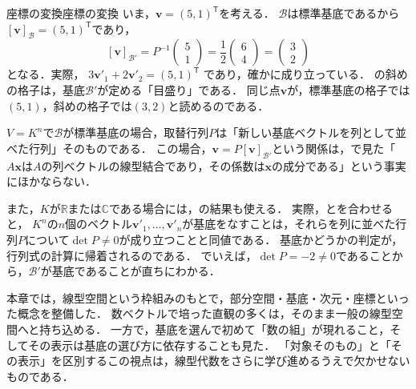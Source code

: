 \begin{example}{座標の変換}{座標の変換}
  いま，$\bm{v} = (5,1)^\mathsf{T}$を考える．
  $\mathcal{B}$は標準基底であるから$[\bm{v}]_{\mathcal{B}} = (5,1)^\mathsf{T}$であり，
  \[
    [\bm{v}]_{\mathcal{B}'}
    = P^{-1}\begin{pmatrix} 5 \\ 1 \end{pmatrix}
    = \frac{1}{2}\begin{pmatrix} 6 \\ 4 \end{pmatrix}
    = \begin{pmatrix} 3 \\ 2 \end{pmatrix}
  \]
  となる．実際，
  $3\bm{v}'_1 + 2\bm{v}'_2 = (5,1)^\mathsf{T}$
  であり，確かに成り立っている．
  の斜めの格子は，基底$\mathcal{B}'$が定める「目盛り」である．
  同じ点$\bm{v}$が，標準基底の格子では$(5,1)$，斜めの格子では$(3,2)$と読めるのである．
\end{example}

\begin{remark}[標準基底の場合と行列式による判定]
  $V = K^n$で$\mathcal{B}$が標準基底の場合，取替行列$P$は「新しい基底ベクトルを列として並べた行列」そのものである．
  この場合，$\bm{v} = P[\bm{v}]_{\mathcal{B}'}$という関係は，で見た「$A\bm{x}$は$A$の列ベクトルの線型結合であり，その係数は$\bm{x}$の成分である」という事実にほかならない．

  また，$K$が$\mathbb{R}$または$\mathbb{C}$である場合には，の結果も使える．
  実際，とを合わせると，
  $K^n$の$n$個のベクトル$\bm{v}'_1, \dots, \bm{v}'_n$が基底をなすことは，それらを列に並べた行列$P$について$\det P \ne 0$が成り立つことと同値である．
  基底かどうかの判定が，行列式の計算に帰着されるのである．
  でいえば，$\det P=-2\ne0$であることから，$\mathcal{B}'$が基底であることが直ちにわかる．
\end{remark}

本章では，線型空間という枠組みのもとで，部分空間・基底・次元・座標といった概念を整備した．
数ベクトルで培った直観の多くは，そのまま一般の線型空間へと持ち込める．
一方で，基底を選んで初めて「数の組」が現れること，そしてその表示は基底の選び方に依存することも見た．
「対象そのもの」と「その表示」を区別するこの視点は，線型代数をさらに学び進めるうえで欠かせないものである．
